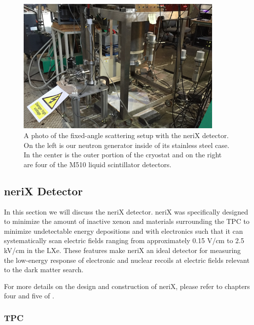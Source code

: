 \begin{figure}[bt]
        \centering
	\includegraphics[width=0.9\textwidth]{nerix_experimental_setup}
	\caption{A photo of the fixed-angle scattering setup with the neriX detector.  On the left is our neutron generator inside of its stainless steel case.  In the center is the outer portion of the cryostat and on the right are four of the M510 liquid scintillator detectors.}
	\label{fig:nerix_experimental_setup}
\end{figure}



\subsection{neriX Detector}

In this section we will discuss the neriX detector.  neriX was specifically designed to minimize the amount of inactive xenon and materials surrounding the TPC to minimize undetectable energy depositions and with electronics such that it can systematically scan electric fields ranging from approximately 0.15 V/cm to 2.5 kV/cm in the LXe.  These features make neriX an ideal detector for measuring the low-energy response of electronic and nuclear recoils at electric fields relevant to the dark matter search.

For more details on the design and construction of neriX, please refer to chapters four and five of .

\subsubsection{TPC}

